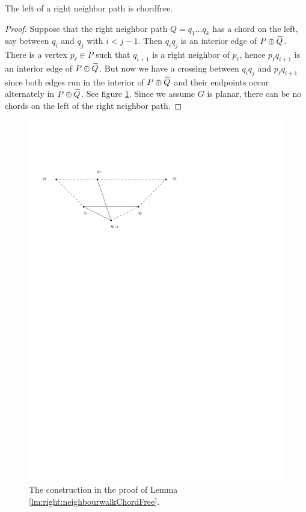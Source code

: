     \begin{lemma}
      \label{lm:right:neighbourwalkChordFree}
      The left of a right neighbor path is chordfree.
    \end{lemma}
    \begin{proof}
      Suppose that the right neighbor path $Q = q_1 \ldots q_k$  has a chord on the left, say between $q_i$ and $q_j$ with $i< j -1 $. Then $q_i q_j$ is an interior edge of $P \oplus \accentset{\leftharpoonup}{Q}$.  There is a vertex $p_\ell \in P$ such that $q_{i+1}$ is a right neighbor of $p_\ell$, hence $p_\ell q_{i+1}$ is an interior edge of $P \oplus \accentset{\leftharpoonup}{Q}$.
      But now we have a crossing between $q_i q_j$ and $p_\ell q_{i+1}$ since both edges run in the interior of $P \oplus \accentset{\leftharpoonup}{Q}$ and their endpoints occur alternately in $P \oplus \accentset{\leftharpoonup}{Q}$.
      See figure \ref{fig:uni:neihbourwalkChordFree}.
      Since we assume $G$ is planar, there can be no chords on the left of the right neighbor path.
    \end{proof}

    \quad

    \quad
      \begin{figure}[h]
        \centering
        \includegraphics[scale=1]{unifiedAlgo/img/rightNeighbourwalk/neighbourWalkChords}
        \caption{The construction in the proof of Lemma \ref{lm:right:neighbourwalkChordFree}.}
        \label{fig:uni:neihbourwalkChordFree}
      \end{figure}
